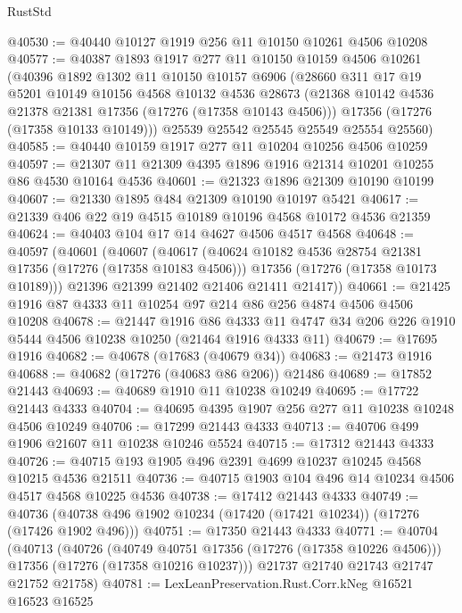 \begin{lexlean}{RustStd}
\begin{coremodule}
@40530 := @40440 @10127 @1919 @256 @11 @10150 @10261 @4506 @10208
@40577 := @40387
    @1893
    @1917
    @277
    @11
    @10150
    @10159
    @4506
    @10261
    (@40396
      @1892
      @1302
      @11
      @10150
      @10157
      @6906
      (@28660
        @311
        @17
        @19
        @5201
        @10149
        @10156
        @4568
        @10132
        @4536
        @28673
        (@21368 @10142 @4536 @21378 @21381 @17356 (@17276 (@17358 @10143 @4506)))
        @17356
        (@17276 (@17358 @10133 @10149)))
      @25539
      @25542
      @25545
      @25549
      @25554
      @25560)
@40585 := @40440 @10159 @1917 @277 @11 @10204 @10256 @4506 @10259
@40597 := @21307 @11 @21309 @4395 @1896 @1916 @21314 @10201 @10255 @86 @4530 @10164 @4536
@40601 := @21323 @1896 @21309 @10190 @10199
@40607 := @21330 @1895 @484 @21309 @10190 @10197 @5421
@40617 := @21339 @406 @22 @19 @4515 @10189 @10196 @4568 @10172 @4536 @21359
@40624 := @40403 @104 @17 @14 @4627 @4506 @4517 @4568
@40648 := @40597
    (@40601
      (@40607
        (@40617
          (@40624 @10182 @4536 @28754 @21381 @17356 (@17276 (@17358 @10183 @4506)))
          @17356
          (@17276 (@17358 @10173 @10189)))
        @21396
        @21399
        @21402
        @21406
        @21411
        @21417))
@40661 := @21425 @1916 @87 @4333 @11 @10254 @97 @214 @86 @256 @4874 @4506 @4506 @10208
@40678 := @21447
    @1916
    @86
    @4333
    @11
    @4747
    @34
    @206
    @226
    @1910
    @5444
    @4506
    @10238
    @10250
    (@21464 @1916 @4333 @11)
@40679 := @17695 @1916
@40682 := @40678 (@17683 (@40679 @34))
@40683 := @21473 @1916
@40688 := @40682 (@17276 (@40683 @86 @206)) @21486
@40689 := @17852 @21443
@40693 := @40689 @1910 @11 @10238 @10249
@40695 := @17722 @21443 @4333
@40704 := @40695 @4395 @1907 @256 @277 @11 @10238 @10248 @4506 @10249
@40706 := @17299 @21443 @4333
@40713 := @40706 @499 @1906 @21607 @11 @10238 @10246 @5524
@40715 := @17312 @21443 @4333
@40726 := @40715 @193 @1905 @496 @2391 @4699 @10237 @10245 @4568 @10215 @4536 @21511
@40736 := @40715 @1903 @104 @496 @14 @10234 @4506 @4517 @4568 @10225 @4536
@40738 := @17412 @21443 @4333
@40749 := @40736 (@40738 @496 @1902 @10234 (@17420 (@17421 @10234)) (@17276 (@17426 @1902 @496)))
@40751 := @17350 @21443 @4333
@40771 := @40704
    (@40713
      (@40726
        (@40749 @40751 @17356 (@17276 (@17358 @10226 @4506)))
        @17356
        (@17276 (@17358 @10216 @10237)))
      @21737
      @21740
      @21743
      @21747
      @21752
      @21758)
@40781 := LexLeanPreservation.Rust.Corr.kNeg
    @16521
    @16523
    @16525

\end{coremodule}
\end{lexlean}
